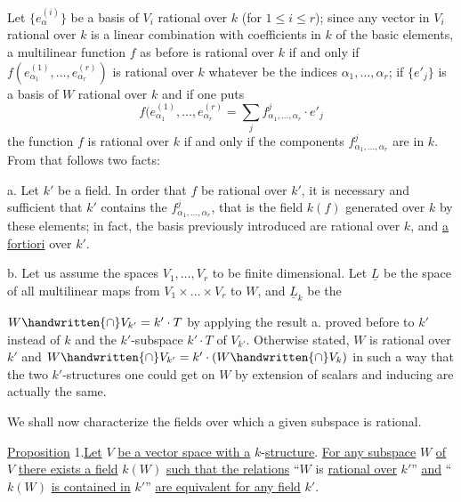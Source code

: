 Let $\{e_\alpha^{(i)}\}$ be a basis of $V_i$ rational over $k$ (for $1\leq i\leq r$); since any vector in $V_i$ rational over $k$ is a linear combination with coefficients in $k$ of the basic elements, a multilinear function $f$ as before is rational over $k$ if and only if $f(e_{\alpha_1}^{(1)},\ldots,e_{\alpha_r}^{(r)})$ is rational over $k$ whatever be the indices $\alpha_1,\ldots,\alpha_r$; if $\{e'_j\}$ is a basis of $W$ rational over $k$ and if one puts
\[
f(e_{\alpha_1}^{(1)},\ldots,e_{\alpha_r}^{(r)}=\sum_j f^j_{\alpha_1,\ldots,\alpha_r}\cdot e'_j
\tag*{(4)}
\]
the function $f$ is rational over $k$ if and only if the components $f^j_{\alpha_1,\ldots,\alpha_r}$ are in $k$. From that follows two facts:

a. Let $k'$ be a field. In order that $f$ be rational over $k'$, it is necessary and sufficient that $k'$ contains the $f^j_{\alpha_1,\ldots,\alpha_r}$, that is the field $k(f)$ generated over $k$ by these elements; in fact, the basis previously introduced are rational over $k$, and \uline{a fortiori} over $k'$.

b. Let us assume the spaces $V_1,\ldots,V_r$ to be finite dimensional. Let $\underline{L}$ be the space of all multilinear maps from $V_1\times\ldots\times V_r$ to $W$, and $\underline{L}_k$ be the


$W\handwritten{\cap}V_{k'}=k'\cdot T$ by applying the result a. proved before to $k'$ instead of $k$ and the $k'$-subspace $k'\cdot T$ of $V_{k'}$. Otherwise stated, $W$ is rational over $k'$ and $W\handwritten{\cap}V_{k'}=k'\cdot(W\handwritten{\cap}V_k)$ in such a way that the two $k'$-structures one could get on $W$ by extension of scalars and inducing are actually the same.

We shall now characterize the fields over which a given subspace is rational.

\uline{Proposition} 1.\quad \uline{Let} $V$ \uline{be a vector space with a} $k$-\uline{structure}. \uline{For any subspace} $W$ \uline{of} $V$ \uline{there exists a field} $k(W)$ \uline{such that the relations} ``$W$ is \uline{rational over} $k'$'' \uline{and} ``$k(W)$ \uline{is contained in} $k'$'' \uline{are equivalent for any field} $k'$.

